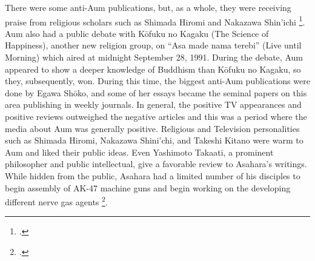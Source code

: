 \documentclass[12pt, letterpaper]{article}
\newcommand{\poses}[1]{#1's}
\newcommand{\say}[1]{``#1''}
\begin{document}

There were some anti-Aum publications, but, as a
whole, they were receiving praise from religious scholars such as Shimada Hiromi and Nakazawa Shin’ichi
\footcite[38]{watanabe_reactions_1997}. Aum also had a public debate with K\=ofuku no Kagaku (The Science of
Happiness), another new religion group, on \say{Asa made nama terebi} (Live until Morning) which aired at
midnight September 28, 1991. During the debate, Aum appeared to show a deeper knowledge of Buddhism than
K\=ofuku no Kagaku, so they, subsequently, won. During this time, the biggest anti-Aum publications were done
by Egawa Sh\=oko, and some of her essays
became the seminal papers on this area publishing in weekly journals. In general, the positive TV appearances
and positive reviews outweighed the negative articles and this was a period where the media about Aum was
generally positive. Religious and Television personalities such as Shimada Hiromi, Nakazawa Shini'chi, and
Takeshi Kitano were warm to Aum and liked their public ideas. Even Yashimoto Takaati, a prominent philosopher
and public intellectual, give a favorable review to \poses{Asahara} writings. While hidden from the public,
Asahara had a limited number of his disciples to begin assembly of AK-47 machine guns and begin working on
the developing different nerve gas agents \footcite[91,92]{watanabe_religion_1998}.
\end{document}
